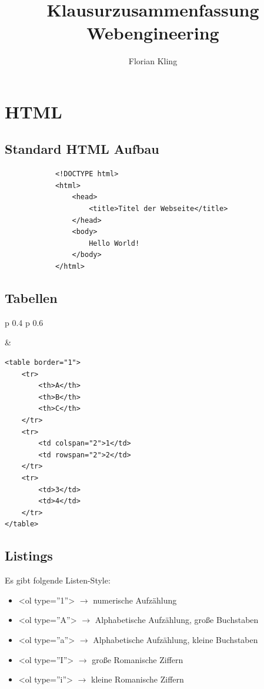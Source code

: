 \documentclass[11pt]{article}
\begin{document}
	
	\title{Klausurzusammenfassung Webengineering}
	\author{Florian Kling}
	
	\maketitle
	
	\newpage
	
	
	\section{HTML}
	
		\subsection{Standard HTML Aufbau}
		
		\begin{lstlisting}
			<!DOCTYPE html>
			<html>
				<head>
					<title>Titel der Webseite</title>
				</head>
				<body>
					Hello World!
				</body>
			</html>
		\end{lstlisting}
		
		
		\subsection{Tabellen}
	

			\begin{tabular}{p {0.4 \textwidth}  p {0.6 \textwidth} }
				\begin{center}
				\end{center}
			
			& 	
				\begin{lstlisting}
<table border="1">
	<tr>
		<th>A</th>
		<th>B</th>
		<th>C</th>
	</tr>
	<tr>
		<td colspan="2">1</td>
		<td rowspan="2">2</td>
	</tr>
	<tr>
		<td>3</td>
		<td>4</td>
	</tr>
</table>
				\end{lstlisting}
			\end{tabular}
	
		\subsection{Listings}
		
			Es gibt folgende Listen-Style:
			
			\begin{itemize}
				\item <ol type=''1''> $\rightarrow$ numerische Aufzählung
				\item <ol type=''A''> $\rightarrow$ Alphabetische Aufzählung, große Buchstaben
				\item <ol type=''a''> $\rightarrow$ Alphabetische Aufzählung, kleine Buchstaben
				\item <ol type=''I''> $\rightarrow$ große Romanische Ziffern
				\item <ol type=''i''> $\rightarrow$ kleine Romanische Ziffern
			\end{itemize}
			
\end{document}
